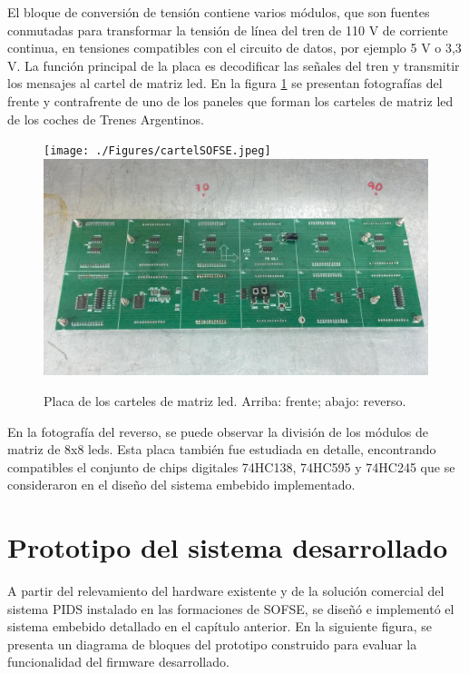 El bloque de conversión de tensión contiene varios módulos, que son fuentes conmutadas para transformar la tensión de línea del tren de 110 V de corriente continua, en tensiones compatibles con el circuito de datos, por ejemplo 5 V o 3,3 V. La función principal de la placa es decodificar las señales del tren y transmitir los mensajes al cartel de matriz led. En la figura \ref{fig:placaDisplay} se presentan fotografías del frente y contrafrente de uno de los paneles que forman los carteles de matriz led de los coches de Trenes Argentinos.\\


\begin{figure}[H]
	\centering
	\texttt{[image: ./Figures/cartelSOFSE.jpeg]}
	\includegraphics[width=1\textwidth]{./Figures/cartel2x6.jpeg}
	\caption{Placa de los carteles de matriz led. Arriba: frente; abajo: reverso.}
	\label{fig:placaDisplay}
\end{figure}

En la fotografía del reverso, se puede observar la división de los módulos de matriz de 8x8 leds. Esta placa también fue estudiada en detalle, encontrando compatibles el conjunto de chips digitales 74HC138, 74HC595 y 74HC245 que se consideraron en el diseño del sistema embebido implementado. \\

\section{Prototipo del sistema desarrollado}

A partir del relevamiento del hardware existente y de la solución comercial del sistema PIDS instalado en las formaciones de SOFSE, se diseñó e implementó el sistema embebido detallado en el capítulo anterior. En la siguiente figura, se presenta un diagrama de bloques del prototipo construido para evaluar la funcionalidad del firmware desarrollado. \\


